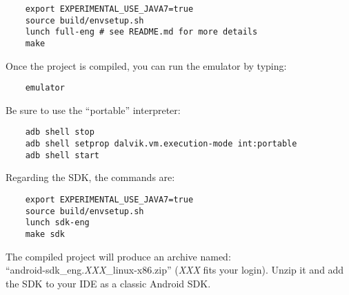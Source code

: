 \documentclass{sig-alternate}
\def \ANDROID{Android\xspace}
\begin{document}
  {\scriptsize \begin{verbatim}
    export EXPERIMENTAL_USE_JAVA7=true
    source build/envsetup.sh
    lunch full-eng # see README.md for more details
    make
  \end{verbatim}}\vspace{-.8em}

  Once the project is compiled, you can run the emulator by typing:

  {\scriptsize \begin{verbatim}
    emulator
  \end{verbatim}}\vspace{-.8em}

  Be sure to use the ``portable'' interpreter:

  {\scriptsize \begin{verbatim}
    adb shell stop
    adb shell setprop dalvik.vm.execution-mode int:portable
    adb shell start
  \end{verbatim}}\vspace{-.8em}

  Regarding the SDK, the commands are:

  {\scriptsize \begin{verbatim}
    export EXPERIMENTAL_USE_JAVA7=true
    source build/envsetup.sh
    lunch sdk-eng
    make sdk
  \end{verbatim}}\vspace{-.8em}

  The compiled project will produce an archive named:\\
  ``android-sdk\_eng.{\it XXX}\_linux-x86.zip''
  ({\it XXX} fits your login).
  Unzip it and add the SDK to your IDE as a classic \ANDROID SDK.
\end{document}
